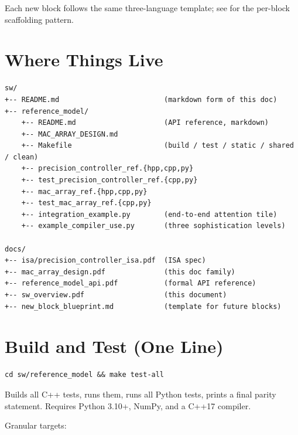 \documentclass[11pt]{article}
\begin{document}
Each new block follows the same three-language template; see
 for the per-block scaffolding
pattern.

\section{Where Things Live}
\label{sec:layout}

\begin{lstlisting}[basicstyle=\ttfamily\small]
sw/
+-- README.md                         (markdown form of this doc)
+-- reference_model/
    +-- README.md                     (API reference, markdown)
    +-- MAC_ARRAY_DESIGN.md
    +-- Makefile                      (build / test / static / shared / clean)
    +-- precision_controller_ref.{hpp,cpp,py}
    +-- test_precision_controller_ref.{cpp,py}
    +-- mac_array_ref.{hpp,cpp,py}
    +-- test_mac_array_ref.{cpp,py}
    +-- integration_example.py        (end-to-end attention tile)
    +-- example_compiler_use.py       (three sophistication levels)

docs/
+-- isa/precision_controller_isa.pdf  (ISA spec)
+-- mac_array_design.pdf              (this doc family)
+-- reference_model_api.pdf           (formal API reference)
+-- sw_overview.pdf                   (this document)
+-- new_block_blueprint.md            (template for future blocks)
\end{lstlisting}

\section{Build and Test (One Line)}
\label{sec:build}

\begin{lstlisting}[basicstyle=\ttfamily\small]
cd sw/reference_model && make test-all
\end{lstlisting}

\noindent
Builds all C++ tests, runs them, runs all Python tests, prints a
final parity statement. Requires Python 3.10+, NumPy, and a C++17
compiler.

Granular targets:
\end{document}
